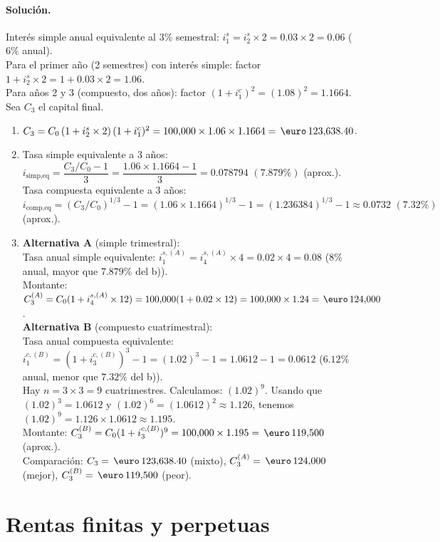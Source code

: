 \documentclass[12pt,a4paper]{article}
\newenvironment{solucion}{\paragraph{Solución.}}{}
\begin{document}
\begin{solucion}
Interés simple anual equivalente al $3\%$ semestral: $i_1^s=i_2^s\times 2=0.03\times 2=0.06$ ($6\%$ anual).\\
Para el primer año (2 semestres) con interés simple: factor $1+i_2^s\times 2=1+0.03\times 2=1.06$.\\
Para años 2 y 3 (compuesto, dos años): factor $(1+i_1^c)^2=(1.08)^2=1.1664$.\\
Sea $C_3$ el capital final.
\begin{enumerate}[label=\alph*)]
  \item $C_3=C_0\,(1+i_2^s\times 2)\,(1+i_1^c)^2=100{,}000\times1.06\times1.1664=\,\text{\euro}\,123{,}638.40$.
  \item Tasa simple equivalente a 3 años: $i_{\text{simp,eq}}=\dfrac{C_3/C_0-1}{3}=\dfrac{1.06\times1.1664-1}{3}=0.078794\,\,(7.879\%)$ (aprox.).\\
        Tasa compuesta equivalente a 3 años: $i_{\text{comp,eq}}=(C_3/C_0)^{1/3}-1=(1.06\times1.1664)^{1/3}-1=(1.236384)^{1/3}-1\approx0.0732\,\,(7.32\%)$ (aprox.).
  \item \textbf{Alternativa A} (simple trimestral):\\
        Tasa anual simple equivalente: $i_1^{s,(A)}=i_4^{s,(A)}\times 4=0.02\times 4=0.08$ ($8\%$ anual, mayor que $7.879\%$ del b)).\\
        Montante: $C_3^{(A)}=C_0(1+i_4^{s,(A)}\times 12)=100{,}000(1+0.02\times 12)=100{,}000\times 1.24=\,\text{\euro}\,124{,}000$.\\
        \textbf{Alternativa B} (compuesto cuatrimestral):\\
        Tasa anual compuesta equivalente: $i_1^{c,(B)}=(1+i_3^{c,(B)})^3-1=(1.02)^3-1=1.0612-1=0.0612$ ($6.12\%$ anual, menor que $7.32\%$ del b)).\\
        Hay $n=3\times 3=9$ cuatrimestres. Calculamos: $(1.02)^9$. Usando que $(1.02)^3=1.0612$ y $(1.02)^6=(1.0612)^2\approx 1.126$, tenemos $(1.02)^9=1.126\times 1.0612\approx 1.195$.\\
        Montante: $C_3^{(B)}=C_0(1+i_3^{c,(B)})^9=100{,}000\times 1.195=\,\text{\euro}\,119{,}500$ (aprox.).\\
        Comparación: $C_3=\,\text{\euro}\,123{,}638.40$ (mixto), $C_3^{(A)}=\,\text{\euro}\,124{,}000$ (mejor), $C_3^{(B)}=\,\text{\euro}\,119{,}500$ (peor).
\end{enumerate}
\end{solucion}

\section{Rentas finitas y perpetuas}
\end{document}
